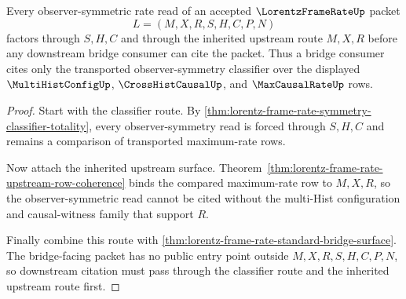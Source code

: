 \begin{theorem}
\label{thm:lorentz-frame-rate-observer-symmetry-bridge-route}
Every observer-symmetric rate read of an accepted $\LorentzFrameRateUp$ packet
$$
L=(M,X,R,S,H,C,P,N)
$$
factors through $S,H,C$ and through the inherited upstream route $M,X,R$ before any downstream bridge consumer can cite the packet. Thus a bridge consumer cites only the transported observer-symmetry classifier over the displayed $\MultiHistConfigUp$, $\CrossHistCausalUp$, and $\MaxCausalRateUp$ rows.
\end{theorem}
\begin{proof}
Start with the classifier route. By \autoref{thm:lorentz-frame-rate-symmetry-classifier-totality}, every observer-symmetry read is forced through $S,H,C$ and remains a comparison of transported maximum-rate rows.

Now attach the inherited upstream surface. Theorem~\ref{thm:lorentz-frame-rate-upstream-row-coherence} binds the compared maximum-rate row to $M,X,R$, so the observer-symmetric read cannot be cited without the multi-Hist configuration and causal-witness family that support $R$.

Finally combine this route with \autoref{thm:lorentz-frame-rate-standard-bridge-surface}. The bridge-facing packet has no public entry point outside $M,X,R,S,H,C,P,N$, so downstream citation must pass through the classifier route and the inherited upstream route first.
\end{proof}

